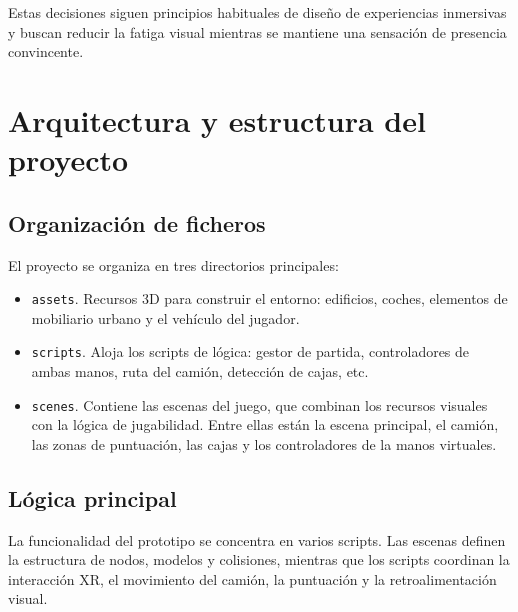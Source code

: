 \documentclass[12pt, a4paper]{article}
\begin{document}
Estas decisiones siguen principios habituales de diseño de experiencias inmersivas y buscan reducir la fatiga visual mientras se mantiene una sensación de presencia convincente.

\section{Arquitectura y estructura del proyecto}

\subsection{Organización de ficheros}

El proyecto se organiza en tres directorios principales:

\begin{itemize}
    \item \texttt{assets}. Recursos 3D para construir el entorno: edificios, coches, elementos de mobiliario urbano y el vehículo del jugador.
    \item \texttt{scripts}. Aloja los scripts de lógica: gestor de partida, controladores de ambas
    manos, ruta del camión, detección de cajas, etc.
    \item \texttt{scenes}. Contiene las escenas del juego, que combinan los recursos visuales con la lógica de jugabilidad. Entre ellas están la escena principal, el camión, las zonas de puntuación, las cajas y los controladores de la manos virtuales.
\end{itemize}

\subsection{Lógica principal}

La funcionalidad del prototipo se concentra en varios scripts. Las
escenas definen la estructura de nodos, modelos y colisiones, mientras que los scripts coordinan
la interacción XR, el movimiento del camión, la puntuación y la retroalimentación visual.
\end{document}
